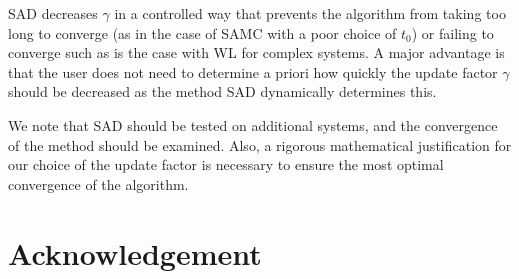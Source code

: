 \documentclass[letterpaper,twocolumn,amsmath,amssymb,pre,aps,10pt]{revtex4-1}
\newcommand{\blue}[1]{{\bf \color{blue} #1}}
\newcommand{\jpsays}[1]{{\color{red} [\blue{Jordan:} \emph{#1}]}}
\begin{document}
SAD decreases $\gamma$ in a controlled way that prevents the algorithm
from taking too long to converge (as in the case of SAMC with a poor choice
of $t_0$) or failing to converge such as is the case with WL for complex
systems. A major advantage is that the user does not need to determine a
priori how quickly the update factor $\gamma$ should be decreased as the
method SAD dynamically determines this.

We note that SAD should be tested on additional systems, and the
convergence of the method should be examined.  Also, a rigorous
mathematical justification for our choice of the update factor is
necessary to ensure the most optimal convergence of the algorithm.

\section{Acknowledgement}




\end{document}
